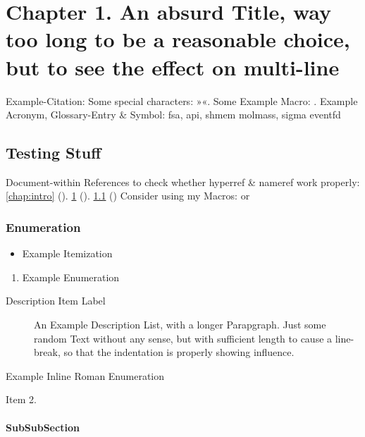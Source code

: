 
\chapter{Chapter 1. An absurd Title, way too long to be a reasonable choice, but to see the effect on multi-line}
\label{chap:chapter1}

Example-Citation:
\cite{DenKr_denkrement1_indeco}
\nl%
Some special characters:
»«.
\nl%
Some Example Macro:
.
\nl%
Example Acronym, Glossary-Entry \& Symbol:\nl
\gls{fsa}, \gls{api}, \gls{shmem}\nl
\gls{molmass}, \gls{sigma}\nl
\gls{eventfd}


\section{Testing Stuff}
\label{sec:testing}

Document-within References to check whether hyperref \& nameref work properly:\nl%
\ref{chap:intro} (). \ref{chap:chapter1}  (). \ref{sec:testing} ()\nl%
Consider using my Macros:\nl
{} or 



\subsection{Enumeration}

\begin{itemize}
\item%
    Example Itemization
\end{itemize}
\begin{enumerate}
\item%
    Example Enumeration
\end{enumerate}
\begin{description}
\item[Description Item Label]%
    An Example Description List, with a longer Parapgraph. Just some random Text without any sense, but with sufficient length to cause a line-break, so that the indentation is properly showing influence.
\end{description}
\begin{enuminlrom}
\item%
    Example Inline Roman Enumeration
\item%
    Item 2.
\end{enuminlrom}


\subsubsection{SubSubSection}

